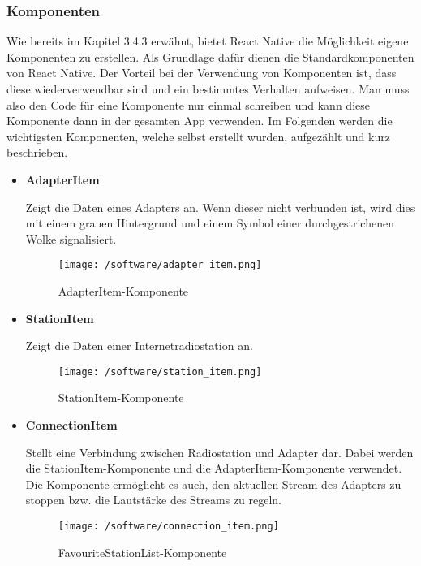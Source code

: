 \documentclass[11pt, twoside]{article}
\begin{document}
\subsubsection{Komponenten}
Wie bereits im Kapitel 3.4.3 erwähnt, bietet React Native die Möglichkeit eigene Komponenten zu erstellen. Als Grundlage dafür dienen die Standardkomponenten von React Native. Der Vorteil bei der Verwendung von Komponenten ist, dass diese wiederverwendbar sind und ein bestimmtes Verhalten aufweisen. Man muss also den Code für eine Komponente nur einmal schreiben und kann diese Komponente dann in der gesamten App verwenden. Im Folgenden werden die wichtigsten Komponenten, welche selbst erstellt wurden, aufgezählt und kurz beschrieben.
\begin{itemize}
	\item \textbf{AdapterItem} \par
	\begin{minipage}{\linewidth}
    Zeigt die Daten eines Adapters an. Wenn dieser nicht verbunden ist, wird dies mit einem grauen Hintergrund und einem Symbol einer durchgestrichenen Wolke signalisiert.
    		\begin{figure}[H]
        		\texttt{[image: /software/adapter\_item.png]}
        		\caption{AdapterItem-Komponente}
    		\end{figure}
	\end{minipage}

	\item \textbf{StationItem} \par
	\begin{minipage}{\linewidth}	
	Zeigt die Daten einer Internetradiostation an.
		\begin{figure}[H]
     		\texttt{[image: /software/station\_item.png]}
    			\caption{StationItem-Komponente}
    		\end{figure}
    	\end{minipage}
    	
	\item \textbf{ConnectionItem} \par
	\begin{minipage}{\linewidth}	
	Stellt eine Verbindung zwischen Radiostation und Adapter dar. Dabei werden die StationItem-Komponente und die AdapterItem-Komponente verwendet. Die Komponente ermöglicht es auch, den aktuellen Stream des Adapters zu stoppen bzw. die Lautstärke des Streams zu regeln.
		\begin{figure}[H]
     	\texttt{[image: /software/connection\_item.png]}
    		\caption{FavouriteStationList-Komponente}
    		\end{figure}
    	\end{minipage}


\end{itemize}
\end{document}

